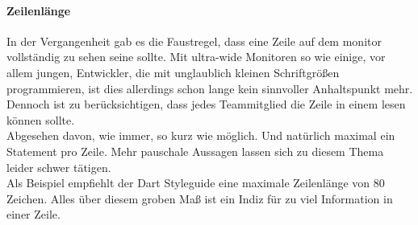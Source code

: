        \paragraph{Zeilenlänge}
            In der Vergangenheit gab es die Faustregel, dass eine Zeile auf dem monitor vollständig zu sehen seine sollte.
            Mit ultra-wide Monitoren so wie einige, vor allem jungen, Entwickler, die mit unglaublich kleinen Schriftgrößen programmieren, ist dies allerdings schon lange kein sinnvoller Anhaltspunkt mehr.
            Dennoch ist zu berücksichtigen, dass jedes Teammitglied die Zeile in einem lesen können sollte.\\
            Abgesehen davon, wie immer, so kurz wie möglich.
            Und natürlich maximal ein Statement pro Zeile.
            Mehr pauschale Aussagen lassen sich zu diesem Thema leider schwer tätigen.\\
            Als Beispiel empfiehlt der Dart Styleguide eine maximale Zeilenlänge von 80 Zeichen.
            Alles über diesem groben Maß ist ein Indiz für zu viel Information in einer Zeile.

